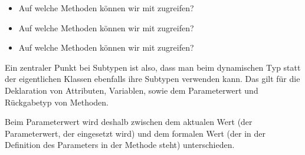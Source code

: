 \documentclass{../tuda-beamer}
\begin{document}
    \begin{frame}
        \begin{itemize}
            \item Auf welche Methoden können wir mit  zugreifen?
            \item Auf welche Methoden können wir mit  zugreifen?
            \item Auf welche Methoden können wir mit  zugreifen?
        \end{itemize}

        \br

        
    \end{frame}

    \begin{frame}[c]
        \begin{note}[title=Information:]
            Ein zentraler Punkt bei Subtypen ist also, dass man beim dynamischen Typ statt der
            eigentlichen Klassen ebenfalls ihre Subtypen verwenden kann. Das gilt für die Deklaration
            von Attributen, Variablen, sowie dem Parameterwert und Rückgabetyp von Methoden.

            \br

            Beim Parameterwert wird deshalb zwischen dem aktualen Wert (der Parameterwert, der
            eingesetzt wird) und dem formalen Wert (der in der Definition des Parameters in der
            Methode steht) unterschieden.
        \end{note}
    \end{frame}
\end{document}
